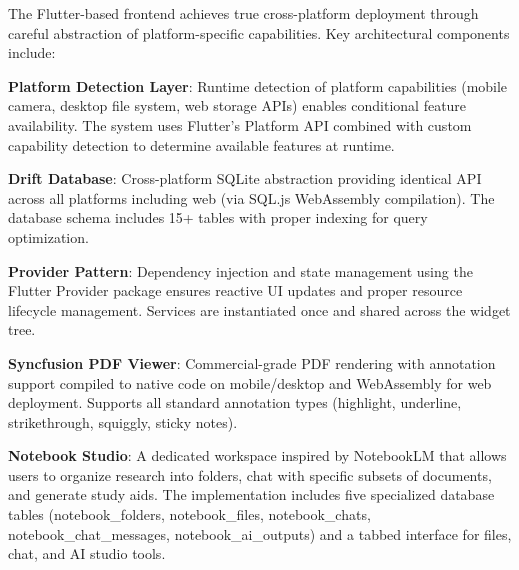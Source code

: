 \documentclass[conference]{IEEEtran}
\begin{document}
The Flutter-based frontend achieves true cross-platform deployment through careful abstraction of platform-specific capabilities. Key architectural components include:

\textbf{Platform Detection Layer}: Runtime detection of platform capabilities (mobile camera, desktop file system, web storage APIs) enables conditional feature availability. The system uses Flutter's Platform API combined with custom capability detection to determine available features at runtime.

\textbf{Drift Database}: Cross-platform SQLite abstraction providing identical API across all platforms including web (via SQL.js WebAssembly compilation). The database schema includes 15+ tables with proper indexing for query optimization.

\textbf{Provider Pattern}: Dependency injection and state management using the Flutter Provider package ensures reactive UI updates and proper resource lifecycle management. Services are instantiated once and shared across the widget tree.

\textbf{Syncfusion PDF Viewer}: Commercial-grade PDF rendering with annotation support compiled to native code on mobile/desktop and WebAssembly for web deployment. Supports all standard annotation types (highlight, underline, strikethrough, squiggly, sticky notes).


\textbf{Notebook Studio}: A dedicated workspace inspired by NotebookLM that allows users to organize research into folders, chat with specific subsets of documents, and generate study aids. The implementation includes five specialized database tables (notebook\_folders, notebook\_files, notebook\_chats, notebook\_chat\_messages, notebook\_ai\_outputs) and a tabbed interface for files, chat, and AI studio tools.
\end{document}
